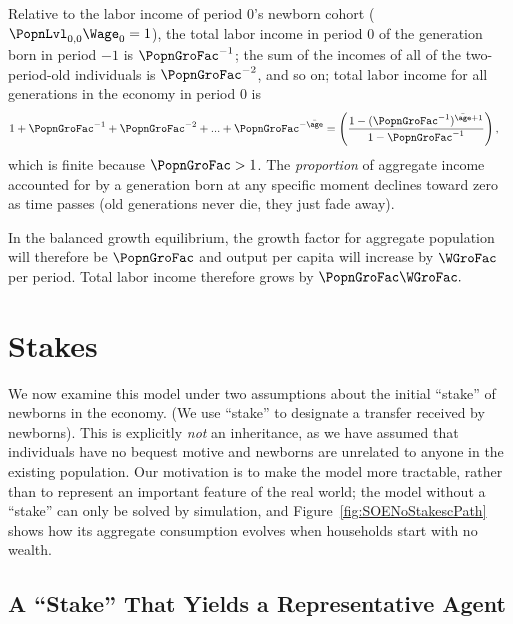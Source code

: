 \documentclass{econark}
\begin{document}
Relative to the labor income of period 0's newborn cohort ($\PopnLvl_{0,0} \Wage_{0} = 1$),
the total labor income in period 0 of the generation born in period $-1$ is $\PopnGroFac^{-1}$; the sum of the incomes of all of the two-period-old individuals is $\PopnGroFac^{-2}$, and so on; total labor income for all generations in the economy in period 0 is
\begin{equation}\begin{gathered}\begin{aligned}
  1 + \PopnGroFac^{-1}+ \PopnGroFac^{-2}+ ...+\PopnGroFac^{-\bar{\age}} & =  \left(\frac{1-(\PopnGroFac^{-1})^{\bar{\age}+1}}{1-\PopnGroFac^{-1}}\right) \label{eq:LabIncTot}
,
\end{aligned}\end{gathered}\end{equation}
which is finite because $\PopnGroFac>1$.  
The {\it proportion} of aggregate income accounted for by a generation
born at any specific moment declines toward zero as time passes (old generations never die,
they just fade away).

In the balanced growth equilibrium, the growth factor for aggregate population
will therefore be $\PopnGroFac$ and output per capita will increase by $\WGroFac$ per period.  Total
labor income therefore grows by $\PopnGroFac \WGroFac.$


\section{Stakes}\label{sec:TractableBufferStockMacro-Stakes}

We now examine this model under two assumptions about the initial
``stake'' of newborns in the economy.  (We use ``stake'' to designate a
transfer received by newborns).  This is explicitly {\it not} an
inheritance, as we have assumed that individuals have no bequest
motive and newborns are unrelated to anyone in the existing
population.  Our motivation is to make the model more tractable,
rather than to represent an important feature of the real world; the model without a ``stake'' can only be solved by simulation, and Figure~\ref{fig:SOENoStakescPath} shows how its aggregate consumption evolves when households start with no wealth.

\subsection{A \texorpdfstring{``Stake''}{\textquotedblleft Stake\textquotedblright} That Yields a Representative Agent}\label{sec:TractableBufferStockMacro-StakeRepAgent}
\end{document}
